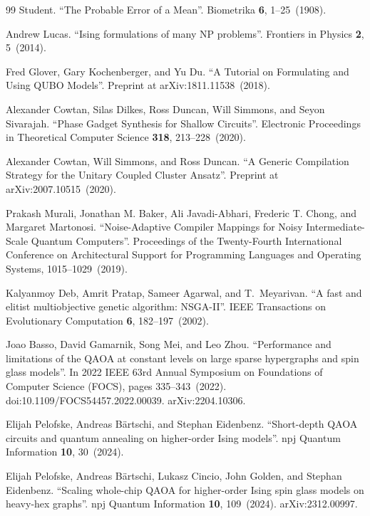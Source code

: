 \begin{thebibliography}{99}
Student.
\newblock ``The Probable Error of a Mean''.
\newblock Biometrika {\bf 6}, 1--25~(1908).


Andrew Lucas.
\newblock ``Ising formulations of many NP problems''.
\newblock Frontiers in Physics {\bf 2}, 5~(2014).


Fred Glover, Gary Kochenberger, and Yu Du.
\newblock ``A Tutorial on Formulating and Using QUBO Models''.
\newblock Preprint at arXiv:1811.11538~(2018).


Alexander Cowtan, Silas Dilkes, Ross Duncan, Will Simmons, and Seyon Sivarajah.
\newblock ``Phase Gadget Synthesis for Shallow Circuits''.
\newblock Electronic Proceedings in Theoretical Computer Science {\bf 318}, 213--228~(2020).


Alexander Cowtan, Will Simmons, and Ross Duncan.
\newblock ``A Generic Compilation Strategy for the Unitary Coupled Cluster Ansatz''.
\newblock Preprint at arXiv:2007.10515~(2020).


Prakash Murali, Jonathan M. Baker, Ali Javadi-Abhari, Frederic T. Chong, and Margaret Martonosi.
\newblock ``Noise-Adaptive Compiler Mappings for Noisy Intermediate-Scale Quantum Computers''.
\newblock Proceedings of the Twenty-Fourth International Conference on Architectural Support for Programming Languages and Operating Systems, 1015--1029~(2019).


Kalyanmoy Deb, Amrit Pratap, Sameer Agarwal, and T.~Meyarivan.
\newblock ``A fast and elitist multiobjective genetic algorithm: NSGA-II''.
\newblock IEEE Transactions on Evolutionary Computation {\bf 6}, 182--197~(2002).

Joao Basso, David Gamarnik, Song Mei, and Leo Zhou.
\newblock ``Performance and limitations of the QAOA at constant levels on large sparse hypergraphs and spin glass models''.
\newblock In 2022 IEEE 63rd Annual Symposium on Foundations of Computer Science (FOCS), pages 335--343~(2022).
\newblock doi:10.1109/FOCS54457.2022.00039.
\newblock arXiv:2204.10306.

Elijah Pelofske, Andreas B{\"a}rtschi, and Stephan Eidenbenz.
\newblock ``Short-depth QAOA circuits and quantum annealing on higher-order Ising models''.
\newblock npj Quantum Information {\bf 10}, 30~(2024).

Elijah Pelofske, Andreas B{\"a}rtschi, Lukasz Cincio, John Golden, and Stephan Eidenbenz.
\newblock ``Scaling whole-chip QAOA for higher-order Ising spin glass models on heavy-hex graphs''.
\newblock npj Quantum Information {\bf 10}, 109~(2024).
\newblock arXiv:2312.00997.


\end{thebibliography}
